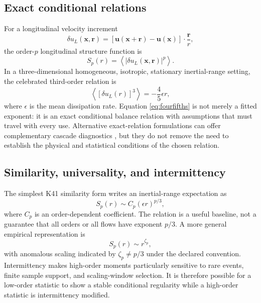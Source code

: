 \documentclass[conference]{../../../../Conference-LaTeX-template_10-17-19/IEEEtran}
\begin{document}
\subsection{Exact conditional relations}
For a longitudinal velocity increment
\begin{equation}
\delta u_L(\mathbf{x},\mathbf{r})=\left[\mathbf{u}(\mathbf{x}+\mathbf{r})-\mathbf{u}(\mathbf{x})\right]\cdot\frac{\mathbf{r}}{r},
\label{eq:increment}
\end{equation}
the order-$p$ longitudinal structure function is
\begin{equation}
S_p(r)=\left\langle\left|\delta u_L(\mathbf{x},\mathbf{r})\right|^p\right\rangle.
\label{eq:structure}
\end{equation}
In a three-dimensional homogeneous, isotropic, stationary inertial-range setting, the celebrated third-order relation is
\begin{equation}
\left\langle\left[\delta u_L(r)\right]^3\right\rangle=-\frac{4}{5}\epsilon r,
\label{eq:fourfifths}
\end{equation}
where $\epsilon$ is the mean dissipation rate. Equation \eqref{eq:fourfifths} is not merely a fitted exponent: it is an exact conditional balance relation with assumptions that must travel with every use. Alternative exact-relation formulations can offer complementary cascade diagnostics \cite{andres_banerjee_2019}, but they do not remove the need to establish the physical and statistical conditions of the chosen relation.

\subsection{Similarity, universality, and intermittency}
The simplest K41 similarity form writes an inertial-range expectation as
\begin{equation}
S_p(r)\sim C_p(\epsilon r)^{p/3},
\label{eq:k41}
\end{equation}
where $C_p$ is an order-dependent coefficient. The relation is a useful baseline, not a guarantee that all orders or all flows have exponent $p/3$. A more general empirical representation is
\begin{equation}
S_p(r)\sim r^{\zeta_p},
\label{eq:zetap}
\end{equation}
with anomalous scaling indicated by $\zeta_p\neq p/3$ under the declared convention. Intermittency makes high-order moments particularly sensitive to rare events, finite sample support, and scaling-window selection. It is therefore possible for a low-order statistic to show a stable conditional regularity while a high-order statistic is intermittency modified.
\end{document}

